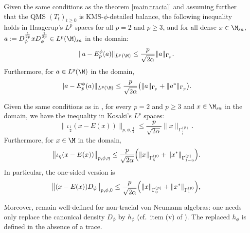 \documentclass[sn-mathphys-num]{sn-jnl}
\begin{document}
\begin{proposition}
     \label{prop:h-lp-conj}
    Given the same conditions as the theorem \ref{main:tracial} and assuming further that the QMS $(T_t)_{t\ge0}$ is KMS-$\phi$-detailed balance, the following inequality holds in Haagerup's $L^p$ spaces for all $p = 2$ and $p \ge 3$, and for all dense $x\in\M_{sa}$, $a:=D_\phi^{\frac 1{2p}} xD_\phi^{\frac 1{2p}}  \in L^p(\M)_{{sa}}$ in the domain:
\[
\|a-E_p^\phi(a)\|_{L^p(\M)} \leq \frac{p}{\sqrt{2\alpha}}\|a\|_{\Gamma_p}.
\]
Furthermore, for $a\in L^p(\M)$ in the domain,
\[
\|a-E_p^\phi(a)\|_{L^p(\M)} \leq \frac{p}{\sqrt{2\alpha}}
\bigl(\|a\|_{\Gamma_p}+\|a^*\|_{\Gamma_p}\bigr).
\]
\end{proposition}
\begin{proposition}
    \label{prop:k-lp-conj}
       Given the same conditions as in , for every $p=2$ and $p\geq 3$ and $x\in\M_{sa}$ in the domain, we have the inequality in Kosaki's $L^p$ spaces:
\[
  \bigl\|\iota_{\frac12}(x-E(x))\bigr\|_{p,\phi,\frac{1}{2}}
   \le
  \frac{p}{\sqrt{2\alpha}}
  \|x\|_{\Gamma^{(p)}_{\frac12}}.
\]
Furthermore, for $x\in\M$ in the domain,
\[
  \bigl\|\iota_{\eta}(x-E(x))\bigr\|_{p,\phi,\eta}
   \le
  \frac{p}{\sqrt{2\alpha}}
  \Bigl(
      \|x\|_{\Gamma^{(p)}_\eta}
      +\|x^*\|_{\Gamma^{(p)}_{1-\eta}}
  \Bigr).
\]
In particular, the one-sided version is
\begin{equation}\label{eq:non-self-adjoint}
  \bigl\|(x-E(x)) D_{\phi}\bigr\|_{p,\phi,0}
   \le
  \frac{p}{\sqrt{2\alpha}}
  \Bigl(
      \|x\|_{\Gamma^{(p)}_0}
      +\|x^*\|_{\Gamma^{(p)}_1}
  \Bigr),
\end{equation}
\end{proposition}
Moreover,  remain well-defined for non-tracial von Neumann algebras: one needs only replace the canonical density $D_{\phi}$ by $h_{\phi}$ (cf.\ item (v) of ). The replaced $h_\phi$ is defined in the absence of a trace.
\end{document}
